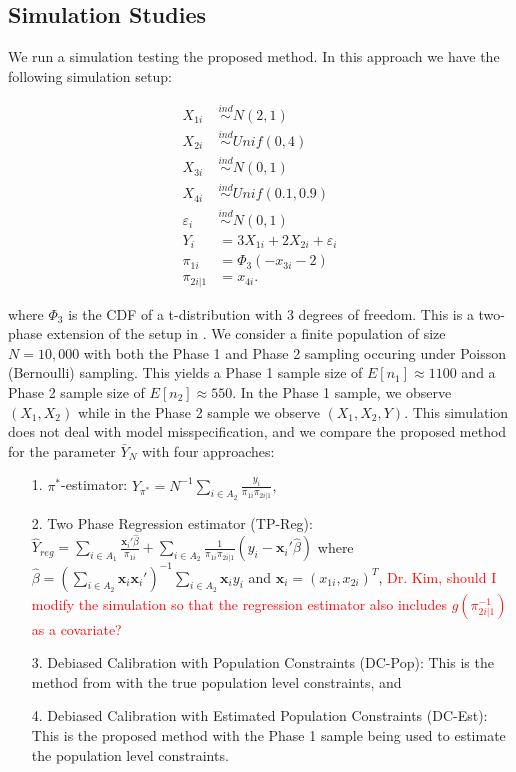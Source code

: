 \documentclass[12pt]{article}
\renewcommand{\bf}[1]{\mathbf{#1}}
\begin{document}
\subsection*{Simulation Studies}

We run a simulation testing the proposed method. In this approach we have the
following simulation setup:

$$
\begin{aligned}
X_{1i} &\stackrel{ind}{\sim} N(2, 1) \\
X_{2i} &\stackrel{ind}{\sim} Unif(0, 4) \\
X_{3i} &\stackrel{ind}{\sim} N(0, 1) \\
X_{4i} &\stackrel{ind}{\sim} Unif(0.1, 0.9) \\
\varepsilon_i &\stackrel{ind}{\sim} N(0, 1) \\
Y_{i} &= 3 X_{1i} + 2 X_{2i} + \varepsilon_i \\
\pi_{1i} &= \Phi_3(-x_{3i} - 2) \\
\pi_{2i|1} &= x_{4i}.
\end{aligned}
$$

where $\Phi_3$ is the CDF of a t-distribution with 3 degrees of freedom.
This is a two-phase extension of the setup in \cite{kwon2024debiased}. We
consider a finite population of size $N = 10,000$ with both the Phase 1 and
Phase 2 sampling occuring under Poisson (Bernoulli) sampling. This yields a
Phase 1 sample
size of $E[n_1] \approx 1100$ and a Phase 2 sample size of
$E[n_2] \approx 550$. In the Phase 1 sample, we observe 
$(X_1, X_2)$ while in the Phase 2 sample we observe $(X_1, X_2, Y)$. This
simulation does not deal with model misspecification, and we compare the
proposed method for the parameter $\bar Y_N$ with four approaches:

\begin{itemize}
  \item[1.] $\pi^*$-estimator: $\hat Y_{\pi^*} = N^{-1} \sum_{i \in A_2}
    \frac{y_i}{\pi_{1i} \pi_{2i|1}},$
  \item[2.] Two Phase Regression estimator (TP-Reg): 
    $\hat Y_{reg} = \sum_{i \in A_1} \frac{\bf x_i' \hat \beta}{\pi_{1i}} + 
    \sum_{i \in A_2} \frac{1}{\pi_{1i}\pi_{2i|1}}(y_i - \bf x_i' \hat \beta)$ 
    where $\hat \beta = 
    \left(\sum_{i \in A_2} \bf x_i \bf x_i'\right)^{-1} \sum_{i \in A_2} \bf x_i y_i$
    and $\bf x_i = (x_{1i}, x_{2i})^T$,
    \textcolor{red}{Dr. Kim, should I modify the simulation so that the
    regression estimator also includes $g(\pi_{2i|1}^{-1})$ as a covariate?}
  \item[3.] Debiased Calibration with Population Constraints (DC-Pop): This is
    the method from \cite{kwon2024debiased} with the true population level
    constraints, and 
  \item[4.] Debiased Calibration with Estimated Population Constraints (DC-Est):
    This is the proposed method with the Phase 1 sample being used to estimate
    the population level constraints.
\end{itemize}
\end{document}
